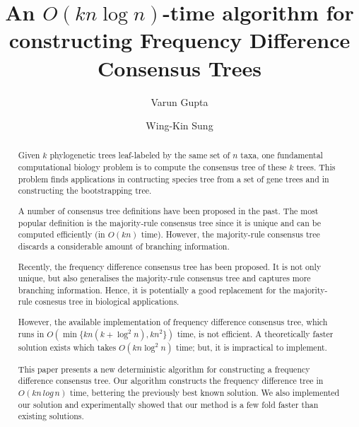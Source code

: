 \documentclass[final,1p,times]{elsarticle}
\begin{document}
\begin{frontmatter}
	\title{An $O(kn \log n)$-time algorithm for constructing Frequency Difference Consensus Trees}
\author[1]{Varun Gupta}
\author[1,2]{Wing-Kin Sung}


\address[1]{School of Computing, National University of Singapore, Singapore}
\address[2]{Genome Institute of Singapore, Singapore}

    \begin{abstract}
	    Given $k$ phylogenetic trees leaf-labeled by the same set of $n$ taxa, one fundamental computational biology problem is to compute the consensus tree of these $k$ trees. This problem finds applications in contructing species tree from a set of gene trees and in constructing the bootstrapping tree.

	    A number of consensus tree definitions have been proposed in the past. The most popular definition is the majority-rule consensus tree since it is unique and can be computed efficiently (in $O(kn)$ time). However, the majority-rule consensus tree discards a considerable amount of branching information.

	    Recently, the frequency difference consensus tree has been proposed. It is not only unique, but also generalises the majority-rule consensus tree and captures more branching information. Hence, it is potentially a good replacement for the majority-rule cosnesus tree in biological applications.

	    However, the available implementation of frequency difference consensus tree, which runs in $O(\min \{ kn(k + \log^2 n), k n^2 \} )$ time, is not efficient. A theoretically faster solution exists which takes $O(k n \log^2 n)$ time; but, it is impractical to implement.

	    This paper presents a new deterministic algorithm for constructing a frequency difference consensus tree. Our algorithm constructs the frequency difference tree in $O(kn\,log\,n)$ time, bettering the previously best known solution. We also implemented our solution and experimentally showed that our method is a few fold faster than existing solutions.
    \end{abstract}

	\begin{keyword}
	\end{keyword}

\end{frontmatter}
\end{document}
